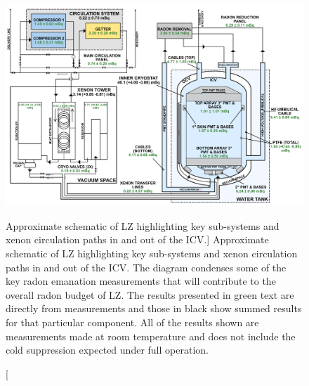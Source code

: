 %
\vspace{1.5cm}
\begin{figure}[h]
    \centering
    \hspace*{-0.2cm}
    \includegraphics[scale=0.3]{Chapter_4/Figures/LZ_Radon_Diagram_Paper.png}
    \caption
    [Approximate schematic of LZ highlighting key sub-systems and xenon circulation paths in and out of the ICV.]
    {Approximate schematic of LZ highlighting key sub-systems and xenon circulation paths in and out of the ICV. The diagram condenses some of the key radon emanation measurements that will contribute to the overall radon budget of LZ. The results presented in green text are directly from measurements and those in black show summed results for that particular component. All of the results shown are measurements made at room temperature and does not include the cold suppression expected under full operation.}
    \label{LZ_radon_diagram_paper}
\end{figure}
%

%

%